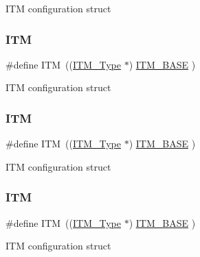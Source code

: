 I\+TM configuration struct \mbox{\label{group___c_m_s_i_s__core__base_gabae7cdf882def602cb787bb039ff6a43}} 
\subsubsection{\texorpdfstring{I\+TM}{ITM}\hspace{0.1cm}{\footnotesize\ttfamily [2/6]}}
{\footnotesize\ttfamily \#define I\+TM~((\hyperlink{struct_i_t_m___type}{I\+T\+M\+\_\+\+Type}       $\ast$)     \hyperlink{group___c_m_s_i_s__core__base_gadd76251e412a195ec0a8f47227a8359e}{I\+T\+M\+\_\+\+B\+A\+SE}      )}

I\+TM configuration struct \mbox{\label{group___c_m_s_i_s__core__base_gabae7cdf882def602cb787bb039ff6a43}} 
\subsubsection{\texorpdfstring{I\+TM}{ITM}\hspace{0.1cm}{\footnotesize\ttfamily [3/6]}}
{\footnotesize\ttfamily \#define I\+TM~((\hyperlink{struct_i_t_m___type}{I\+T\+M\+\_\+\+Type}       $\ast$)     \hyperlink{group___c_m_s_i_s__core__base_gadd76251e412a195ec0a8f47227a8359e}{I\+T\+M\+\_\+\+B\+A\+SE}      )}

I\+TM configuration struct \mbox{\label{group___c_m_s_i_s__core__base_gabae7cdf882def602cb787bb039ff6a43}} 
\subsubsection{\texorpdfstring{I\+TM}{ITM}\hspace{0.1cm}{\footnotesize\ttfamily [4/6]}}
{\footnotesize\ttfamily \#define I\+TM~((\hyperlink{struct_i_t_m___type}{I\+T\+M\+\_\+\+Type}       $\ast$)     \hyperlink{group___c_m_s_i_s__core__base_gadd76251e412a195ec0a8f47227a8359e}{I\+T\+M\+\_\+\+B\+A\+SE}      )}

I\+TM configuration struct \mbox{\label{group___c_m_s_i_s__core__base_gabae7cdf882def602cb787bb039ff6a43}} 
